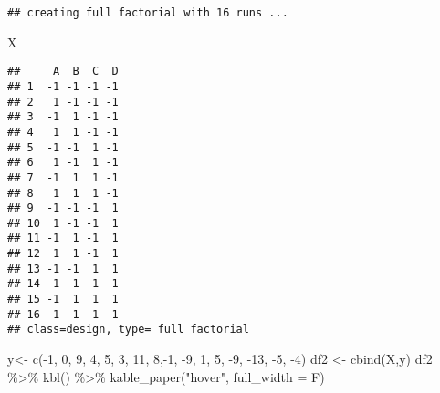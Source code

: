 \documentclass[
]{book}
\newenvironment{Shaded}{\begin{snugshade}}{\end{snugshade}}
\newcommand{\AttributeTok}[1]{\textcolor[rgb]{0.77,0.63,0.00}{#1}}
\newcommand{\DecValTok}[1]{\textcolor[rgb]{0.00,0.00,0.81}{#1}}
\newcommand{\FunctionTok}[1]{\textcolor[rgb]{0.00,0.00,0.00}{#1}}
\newcommand{\NormalTok}[1]{#1}
\newcommand{\OtherTok}[1]{\textcolor[rgb]{0.56,0.35,0.01}{#1}}
\newcommand{\SpecialCharTok}[1]{\textcolor[rgb]{0.00,0.00,0.00}{#1}}
\newcommand{\StringTok}[1]{\textcolor[rgb]{0.31,0.60,0.02}{#1}}
\begin{document}
\begin{verbatim}
## creating full factorial with 16 runs ...
\end{verbatim}

\begin{Shaded}
\begin{Highlighting}[]
\NormalTok{X}
\end{Highlighting}
\end{Shaded}

\begin{verbatim}
##     A  B  C  D
## 1  -1 -1 -1 -1
## 2   1 -1 -1 -1
## 3  -1  1 -1 -1
## 4   1  1 -1 -1
## 5  -1 -1  1 -1
## 6   1 -1  1 -1
## 7  -1  1  1 -1
## 8   1  1  1 -1
## 9  -1 -1 -1  1
## 10  1 -1 -1  1
## 11 -1  1 -1  1
## 12  1  1 -1  1
## 13 -1 -1  1  1
## 14  1 -1  1  1
## 15 -1  1  1  1
## 16  1  1  1  1
## class=design, type= full factorial
\end{verbatim}

\begin{Shaded}
\begin{Highlighting}[]
\NormalTok{y}\OtherTok{\textless{}{-}} \FunctionTok{c}\NormalTok{(}\SpecialCharTok{{-}}\DecValTok{1}\NormalTok{, }\DecValTok{0}\NormalTok{, }\DecValTok{9}\NormalTok{, }\DecValTok{4}\NormalTok{, }\DecValTok{5}\NormalTok{, }\DecValTok{3}\NormalTok{, }\DecValTok{11}\NormalTok{, }\DecValTok{8}\NormalTok{,}\SpecialCharTok{{-}}\DecValTok{1}\NormalTok{, }\SpecialCharTok{{-}}\DecValTok{9}\NormalTok{, }\DecValTok{1}\NormalTok{, }\DecValTok{5}\NormalTok{, }\SpecialCharTok{{-}}\DecValTok{9}\NormalTok{, }\SpecialCharTok{{-}}\DecValTok{13}\NormalTok{, }\SpecialCharTok{{-}}\DecValTok{5}\NormalTok{, }\SpecialCharTok{{-}}\DecValTok{4}\NormalTok{)}
\NormalTok{df2 }\OtherTok{\textless{}{-}} \FunctionTok{cbind}\NormalTok{(X,y)}
\NormalTok{df2 }\SpecialCharTok{\%\textgreater{}\%}  \FunctionTok{kbl}\NormalTok{() }\SpecialCharTok{\%\textgreater{}\%}   \FunctionTok{kable\_paper}\NormalTok{(}\StringTok{"hover"}\NormalTok{, }\AttributeTok{full\_width =}\NormalTok{ F)}
\end{Highlighting}
\end{Shaded}
\end{document}
